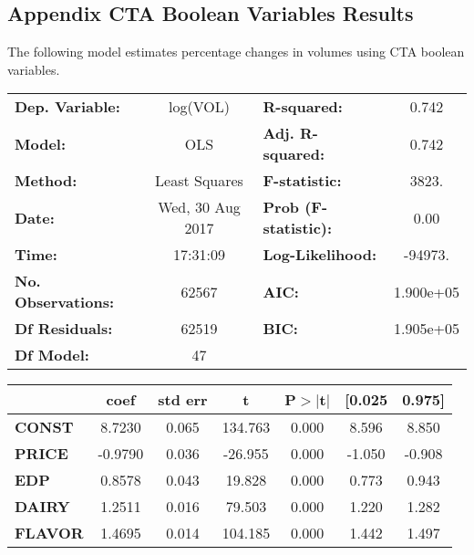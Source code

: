 \documentclass{article}
\begin{document}
\subsection{Appendix CTA Boolean Variables Results}

The following model estimates percentage changes in volumes using CTA boolean variables.

\begin{center}
\begin{tabular}{lclc}
\toprule
\textbf{Dep. Variable:}    &        log(VOL)         & \textbf{  R-squared:         } &     0.742   \\
\textbf{Model:}            &       OLS        & \textbf{  Adj. R-squared:    } &     0.742   \\
\textbf{Method:}           &  Least Squares   & \textbf{  F-statistic:       } &     3823.   \\
\textbf{Date:}             & Wed, 30 Aug 2017 & \textbf{  Prob (F-statistic):} &     0.00    \\
\textbf{Time:}             &     17:31:09     & \textbf{  Log-Likelihood:    } &   -94973.   \\
\textbf{No. Observations:} &       62567      & \textbf{  AIC:               } & 1.900e+05   \\
\textbf{Df Residuals:}     &       62519      & \textbf{  BIC:               } & 1.905e+05   \\
\textbf{Df Model:}         &          47      & \textbf{                     } &             \\
\bottomrule
\end{tabular}
\begin{tabular}{lcccccc}
               & \textbf{coef} & \textbf{std err} & \textbf{t} & \textbf{P$>$$|$t$|$} & \textbf{[0.025} & \textbf{0.975]}  \\
\midrule
\textbf{CONST} &       8.7230  &        0.065     &   134.763  &         0.000        &        8.596    &        8.850     \\
\textbf{PRICE}    &      -0.9790  &        0.036     &   -26.955  &         0.000        &       -1.050    &       -0.908     \\
\textbf{EDP}    &       0.8578  &        0.043     &    19.828  &         0.000        &        0.773    &        0.943     \\
\textbf{DAIRY}    &       1.2511  &        0.016     &    79.503  &         0.000        &        1.220    &        1.282     \\
\textbf{FLAVOR}    &       1.4695  &        0.014     &   104.185  &         0.000        &        1.442    &        1.497     \\

\end{tabular}
\end{center}
\end{document}
